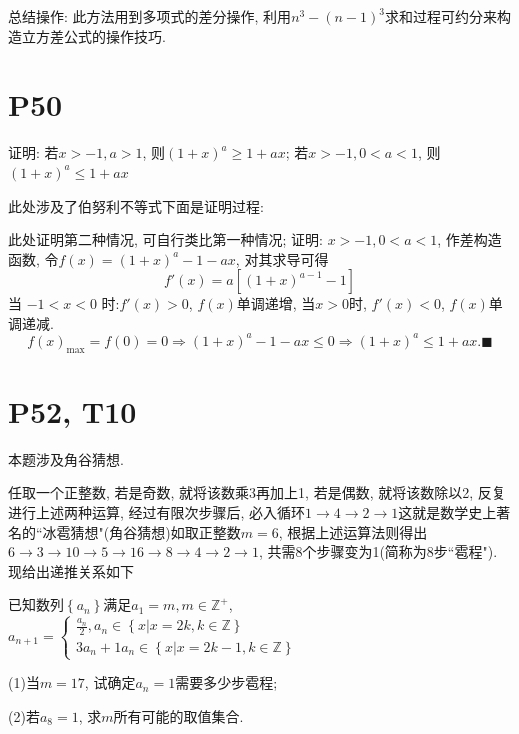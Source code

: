 \documentclass{book}
\begin{document}
    总结操作: 此方法用到多项式的\textcolor[rgb]{0.75,0.17,0.22}{差分}操作, 利用$n^3-(n-1)^3$求和过程可约分来构造立方差公式的操作技巧.
    \section{\textcolor[rgb]{0.11,0.65,0.52}{P50}}
    \begin{boxB}
        证明: 若$x>-1,a>1$, 则$\displaystyle \left( 1+x \right)^a\ge 1+ax$; 若$x>-1,0<a<1$, 则$\displaystyle \left( 1+x \right)^a\le 1+ax$
    \end{boxB}
    此处涉及了\textcolor[rgb]{0.38,0.11,0.2}{伯努利不等式}下面是证明过程:

    此处证明第二种情况, 可自行类比第一种情况; 证明: $x>-1,0<a<1$, \textcolor[rgb]{0.75,0.17,0.22}{作差构造函数}, 令$\displaystyle f(x)=\left( 1+x \right)^a-1-ax$, 对其求导可得$$f'(x)=a\left[ \left( 1+x \right)^{a-1}-1 \right]$$
    当 $-1<x<0$ 时:$f'(x)>0$, $f(x)$单调递增, 当$x>0$时, $f'(x)<0$, $f(x)$单调递减.
    $$f(x)_{\max }=f(0)=0\Longrightarrow \left( 1+x \right)^a-1-ax\le 0\Longrightarrow \left( 1+x \right)^a\le 1+ax.\blacksquare$$

    \section{\textcolor[rgb]{0.11,0.65,0.52}{P52, T10}}

    本题涉及\textcolor[rgb]{0.38,0.11,0.2}{角谷猜想}.

    任取一个正整数, 若是奇数, 就将该数乘3再加上1, 若是偶数, 就将该数除以2, 反复进行上述两种运算, 经过有限次步骤后, 必入循环$1\rightarrow 4\rightarrow 2\rightarrow 1$这就是数学史上著名的``冰雹猜想"(角谷猜想)如取正整数$m=6$, 根据上述运算法则得出$6\rightarrow 3\rightarrow 10\rightarrow 5\rightarrow 16\rightarrow 8\rightarrow 4\rightarrow 2\rightarrow 1$, 共需8个步骤变为1(简称为8步``雹程"). 现给出递推关系如下

    已知数列$\left\{ a_n \right\}$满足$a_1=m,m\in \mathbb{Z}^+$,$\displaystyle a_{n+1}=\left\{\begin{matrix}
    \displaystyle \frac{a_n}{2},a_n\in\left \{ x|x=2k,k\in \mathbb{Z}  \right \} \\
    3a_n+1 a_n\in\left \{ x|x=2k-1,k\in \mathbb{Z}  \right \}
\end{matrix}\right. $

    (1)当$m=17$, 试确定$a_n=1$需要多少步雹程;

    (2)若$a_8=1$, 求$m$所有可能的取值集合.
\end{document}
